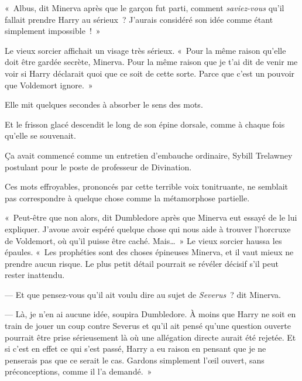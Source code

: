 \later

«~Albus, dit Minerva après que le garçon fut parti, comment \emph{saviez-vous} qu'il fallait prendre Harry au sérieux~? J'aurais considéré son idée comme étant simplement impossible~!~»

Le vieux sorcier affichait un visage très sérieux. «~Pour la même raison qu'elle doit être gardée secrète, Minerva. Pour la même raison que je t'ai dit de venir me voir si Harry déclarait quoi que ce soit de cette sorte. Parce que c'est un pouvoir que Voldemort ignore.~»

Elle mit quelques secondes à absorber le sens des mots.

Et le frisson glacé descendit le long de son épine dorsale, comme à chaque fois qu'elle se souvenait.

Ça avait commencé comme un entretien d'embauche ordinaire, Sybill Trelawney postulant pour le poste de professeur de Divination.


Ces mots effroyables, prononcés par cette terrible voix tonitruante, ne semblait pas correspondre à quelque chose comme la métamorphose partielle.

«~Peut-être que non alors, dit Dumbledore après que Minerva eut essayé de le lui expliquer. J'avoue avoir espéré quelque chose qui nous aide à trouver l'horcruxe de Voldemort, où qu'il puisse être caché. Mais…~» Le vieux sorcier haussa les épaules. «~Les prophéties sont des choses épineuses Minerva, et il vaut mieux ne prendre aucun risque. Le plus petit détail pourrait se révéler décisif s'il peut rester inattendu.

--- Et que pensez-vous qu'il ait voulu dire au sujet de \emph{Severus}~? dit Minerva.

--- Là, je n'en ai aucune idée, soupira Dumbledore. À moins que Harry ne soit en train de jouer un coup contre Severus et qu'il ait pensé qu'une question ouverte pourrait être prise sérieusement là où une allégation directe aurait été rejetée. Et si c'est en effet ce qui s'est passé, Harry a eu raison en pensant que je ne penserais pas que ce serait le cas. Gardons simplement l'œil ouvert, sans préconceptions, comme il l'a demandé.~»

